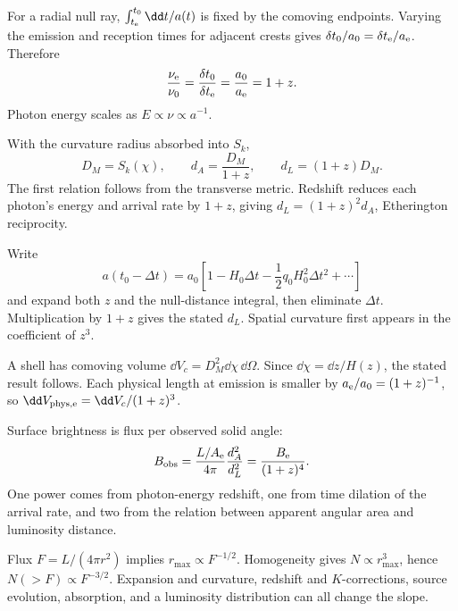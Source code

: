 \begin{solutions}

\begin{solution}
For a radial null ray,
\(\int_{t_{\rm e}}^{t_0}\dd t/a(t)\) is fixed by the comoving endpoints.
Varying the emission and reception times for adjacent crests gives
\(\delta t_0/a_0=\delta t_{\rm e}/a_{\rm e}\).  Therefore
\[
\frac{\nu_{\rm e}}{\nu_0}
=\frac{\delta t_0}{\delta t_{\rm e}}
=\frac{a_0}{a_{\rm e}}=1+z.
\]
Photon energy scales as \(E\propto\nu\propto a^{-1}\).
\end{solution}

\begin{solution}
With the curvature radius absorbed into \(S_k\),
\[
D_M=S_k(\chi),\qquad
d_A=\frac{D_M}{1+z},\qquad
d_L=(1+z)D_M.
\]
The first relation follows from the transverse metric.  Redshift reduces each
photon's energy and arrival rate by \(1+z\), giving
\(d_L=(1+z)^2d_A\), Etherington reciprocity.
\end{solution}

\begin{solution}
Write
\[
a(t_0-\Delta t)=a_0
\left[1-H_0\Delta t-\frac12q_0H_0^2\Delta t^2+\cdots\right]
\]
and expand both \(z\) and the null-distance integral, then eliminate
\(\Delta t\).  Multiplication by \(1+z\) gives the stated \(d_L\).
Spatial curvature first appears in the coefficient of \(z^3\).
\end{solution}

\begin{solution}
A shell has comoving volume
\(\dd V_c=D_M^2\dd\chi\,\dd\Omega\).  Since
\(\dd\chi=\dd z/H(z)\), the stated result follows.  Each physical length at
emission is smaller by \(a_{\rm e}/a_0=(1+z)^{-1}\), so
\(\dd V_{\rm phys,e}=\dd V_c/(1+z)^3\).
\end{solution}

\begin{solution}
Surface brightness is flux per observed solid angle:
\[
B_{\rm obs}=\frac{L/A_{\rm e}}{4\pi}
\frac{d_A^2}{d_L^2}
=\frac{B_{\rm e}}{(1+z)^4}.
\]
One power comes from photon-energy redshift, one from time dilation of the
arrival rate, and two from the relation between apparent angular area and
luminosity distance.
\end{solution}

\begin{solution}
Flux \(F=L/(4\pi r^2)\) implies
\(r_{\max}\propto F^{-1/2}\).  Homogeneity gives
\(N\propto r_{\max}^3\), hence \(N(>F)\propto F^{-3/2}\).
Expansion and curvature, redshift and \(K\)-corrections, source evolution,
absorption, and a luminosity distribution can all change the slope.
\end{solution}


\end{solutions}
